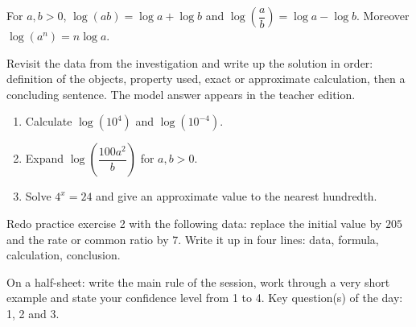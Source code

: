 \begin{traceecrite}For $a,b>0$, $\log(ab)=\log a+\log b$ and $\log\!\left(\dfrac ab\right)=\log a-\log b$. Moreover $\log(a^n)=n\log a$.\end{traceecrite}

\begin{exemple}
Revisit the data from the investigation and write up the solution in order: definition of the objects, property used, exact or approximate calculation, then a concluding sentence. The model answer appears in the teacher edition.
\end{exemple}

\begin{exercice}[-- essentiel]
\begin{enumerate}\item Calculate $\log(10^4)$ and $\log(10^{-4})$.\item Expand $\log\!\left(\dfrac{100a^2}{b}\right)$ for $a,b>0$.\item Solve $4^x=24$ and give an approximate value to the nearest hundredth.\end{enumerate}
\end{exercice}


\begin{dm}Redo practice exercise 2 with the following data: replace the initial value by $205$ and the rate or common ratio by $7$. Write it up in four lines: data, formula, calculation, conclusion.\end{dm}

\begin{sortie}On a half-sheet: write the main rule of the session, work through a very short example and state your confidence level from 1 to 4. Key question(s) of the day: 1, 2 and 3.\end{sortie}

